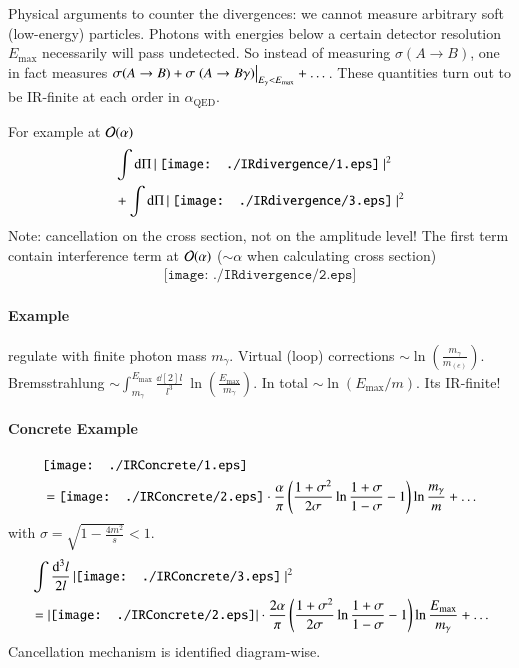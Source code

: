 Physical arguments to counter the divergences: we cannot measure arbitrary soft (low-energy) particles. Photons with energies below a certain detector resolution $E_\text{max}$ necessarily will pass undetected. So instead of measuring $\sigma(A \rightarrow B)$, one in fact measures $\sigma(A \rightarrow B) + \sigma \eval{(A \rightarrow B \gamma)}_{E_{\gamma} < E_\text{max}} + \dots$. These quantities turn out to be IR-finite at each order in $\alpha_{\text{QED}}$.

For example at $\order{\alpha}$
\begin{align*}
   &\int \dd{\Pi} \left| 
   \vcenter{\hbox{
   \texttt{[image: ./IRdivergence/1.eps]} 
   }}
   \right|^2  \\
   & + \int \dd{\Pi} 
   \left|  
   \vcenter{\hbox{
   \texttt{[image: ./IRdivergence/3.eps]} 
   }}\right|^2
\end{align*}
Note: cancellation on the cross section, not on the amplitude level! The first term contain interference term at $\order{\alpha}$ ($\sim \alpha$ when calculating cross section)
\begin{align*}
   \texttt{[image: ./IRdivergence/2.eps]} 
\end{align*}

\paragraph{Example} regulate with finite photon mass $m_\gamma$. Virtual (loop) corrections $\sim \ln(\frac{m_\gamma}{m_{(e)}})$. Bremsstrahlung $\sim \int_{m_\gamma}^{E_\text{max}} \frac{\dd[2]{l}}{l^3} ~ \ln(\frac{E_\text{max}}{m_\gamma})$. In total $\sim \ln(E_\text{max}/ m)$. Its IR-finite!

\paragraph{Concrete Example}
\begin{align*}
   &\texttt{[image: ./IRConcrete/1.eps]}  \\
  &  = \vcenter{\hbox{\texttt{[image: ./IRConcrete/2.eps]}}} \cdot \frac{\alpha}{\pi} \left( \frac{1+\sigma^2}{2 \sigma} \ln \frac{1+\sigma}{1-\sigma} - 1 \right)\ln \frac{m_\gamma}{m}  + \dots 
\end{align*}
with $\sigma = \sqrt{1-\frac{4m^2}{s}} < 1$.
\begin{align*}
   & \int \frac{\dd[3]{l}}{2l} \left| \vcenter{\hbox{\texttt{[image: ./IRConcrete/3.eps]} }} \right|^2 \\
  & = \left|\vcenter{\hbox{\texttt{[image: ./IRConcrete/2.eps]}}} \right| \cdot \frac{2 \alpha}{\pi} \left( \frac{1+\sigma^2}{2\sigma} \ln \frac{1+\sigma}{1-\sigma} - 1 \right) \ln \frac{E_\text{max}}{m_\gamma} + \dots
\end{align*}
Cancellation mechanism is identified diagram-wise.

